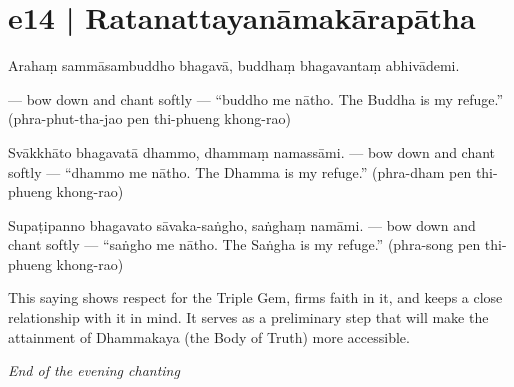 \section*{e14 | Ratanattayanāmakārapātha}

\begin{chantsubsection}
  \chantnote
    {Arahaṃ sammāsambuddho bhagavā, buddhaṃ bhagavantaṃ abhivādemi.}
    
  \chantgap
  \chantnote
    {--- bow down and chant softly ---}
  \chantnote
    {“buddho me nātho.}
  \chantnote
    {The Buddha is my refuge.”}
  \chantindent
    {(phra-phut-tha-jao pen thi-phueng khong-rao)}
  \chantgap
  \chantgap
  
  \chantnote
    {Svākkhāto bhagavatā dhammo, dhammaṃ namassāmi.}
  \chantnote
    {--- bow down and chant softly ---}
  \chantnote
    {“dhammo me nātho.}
  \chantnote
    {The Dhamma is my refuge.”}
  \chantindent
    {(phra-dham pen thi-phueng khong-rao)}
  \chantgap
  \chantgap
  
  \chantnote
    {Supaṭipanno bhagavato sāvaka-saṅgho, saṅghaṃ namāmi.}
  \chantnote
    {--- bow down and chant softly ---}
  \chantnote
    {“saṅgho me nātho.}
  \chantnote
    {The Saṅgha is my refuge.”}
  \chantindent
    {(phra-song pen thi-phueng khong-rao)}
\end{chantsubsection}

\chantgap
\chantgap
{\englishstyle
This saying shows respect for the Triple Gem, firms faith in it, and keeps a close relationship with it in mind. It serves as a preliminary step that will make the attainment of Dhammakaya (the Body of Truth) more accessible.}

\chantgap
\chantgap
{\englishstyle\textit{End of the evening chanting}
}
